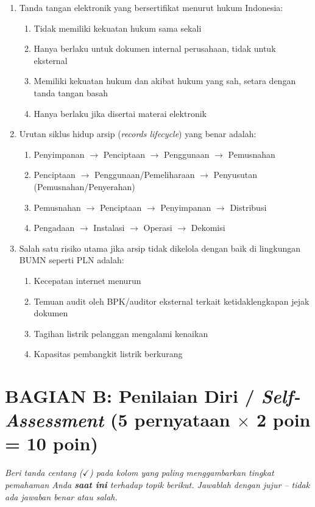 \documentclass[12pt,a4paper]{report}
\begin{document}
\begin{enumerate}[leftmargin=*, itemsep=0.5cm]
\item Tanda tangan elektronik yang bersertifikat menurut hukum Indonesia:
\begin{enumerate}[label=\Alph*., nosep]
    \item Tidak memiliki kekuatan hukum sama sekali
    \item Hanya berlaku untuk dokumen internal perusahaan, tidak untuk eksternal
    \item Memiliki kekuatan hukum dan akibat hukum yang sah, setara dengan tanda tangan basah
    \item Hanya berlaku jika disertai materai elektronik
\end{enumerate}

\item Urutan siklus hidup arsip (\textit{records lifecycle}) yang benar adalah:
\begin{enumerate}[label=\Alph*., nosep]
    \item Penyimpanan $\rightarrow$ Penciptaan $\rightarrow$ Penggunaan $\rightarrow$ Pemusnahan
    \item Penciptaan $\rightarrow$ Penggunaan/Pemeliharaan $\rightarrow$ Penyusutan (Pemusnahan/Penyerahan)
    \item Pemusnahan $\rightarrow$ Penciptaan $\rightarrow$ Penyimpanan $\rightarrow$ Distribusi
    \item Pengadaan $\rightarrow$ Instalasi $\rightarrow$ Operasi $\rightarrow$ Dekomisi
\end{enumerate}

\item Salah satu risiko utama jika arsip tidak dikelola dengan baik di lingkungan BUMN seperti PLN adalah:
\begin{enumerate}[label=\Alph*., nosep]
    \item Kecepatan internet menurun
    \item Temuan audit oleh BPK/auditor eksternal terkait ketidaklengkapan jejak dokumen
    \item Tagihan listrik pelanggan mengalami kenaikan
    \item Kapasitas pembangkit listrik berkurang
\end{enumerate}

\end{enumerate}

\newpage
\section{BAGIAN B: Penilaian Diri / \textit{Self-Assessment} (5 pernyataan $\times$ 2 poin = 10 poin)}
\textit{Beri tanda centang ($\checkmark$) pada kolom yang paling menggambarkan tingkat pemahaman Anda \textbf{saat ini} terhadap topik berikut. Jawablah dengan jujur -- tidak ada jawaban benar atau salah.}
\end{document}
